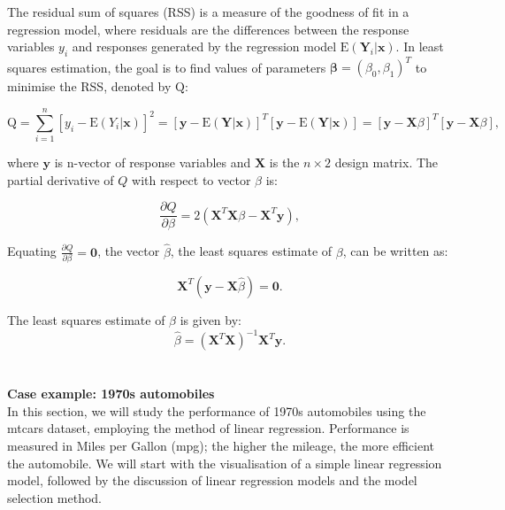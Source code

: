 \documentclass{article}\usepackage[]{graphicx}\usepackage[]{xcolor}
\numberwithin{equation}{section}
\begin{document}
\noindent The residual sum of squares (RSS) is a measure of the goodness of fit in a regression model, where residuals are the differences between the response variables $y_i$ and responses generated by the regression model $\mathrm{E}(\mathbf{Y}_i | \mathbf{x})$. In least squares estimation, the goal is to find values of parameters $\mathbf{\beta} = (\beta_0, \beta_1)^T$ to minimise the RSS, denoted by $\mathrm{Q}$: 

\begin{equation}\label{eq:4-3}
\mathrm{Q} = \sum_{i=1}^{n} [y_i - \mathrm{E} (Y_i | \mathbf{x})]^2 
           = [\mathbf{y}- \mathrm{E} (\mathbf{Y} | \mathbf{x})]^{T} [\mathbf{y}- \mathrm{E} (\mathbf{Y} | \mathbf{x})] 
           = [\mathbf{y}- \mathbf{X} \beta]^{T} [\mathbf{y}- \mathbf{X} \beta],
\end{equation}

\noindent
where $\mathbf{y}$ is n-vector of response variables and $\mathbf{X}$ is the $n \times 2$ design matrix. The partial derivative of $Q$ with respect to vector $\beta$ is:

\begin{equation}\label{eq:4-4}
\frac{\partial Q}{\partial \beta} = 2(\mathbf{X}^T\mathbf{X}\beta - \mathbf{X}^T\mathbf{y}),
\end{equation}

\noindent
Equating $\frac{\partial Q}{\partial \beta} = \mathbf{0}$, the vector $\hat{\beta}$, the least squares estimate of $\beta$, can be written as:

\begin{equation}\label{eq:4-5}
\mathbf{X}^T(\mathbf{y}-\mathbf{X}\hat{\beta})=\mathbf{0}.
\end{equation}

\noindent 
The least squares estimate of $\beta$ is given by:
\begin{equation}\label{eq:4-6}
\hat{\beta} = (\mathbf{X}^T\mathbf{X})^{-1}\mathbf{X}^T\mathbf{y}.
\end{equation}
\\ 
\noident 
\\\textbf{Case example: 1970s automobiles}\\
\noindent In this section, we will study the performance of 1970s automobiles using the mtcars dataset, employing the method of linear regression. Performance is measured in Miles per Gallon (mpg); the higher the mileage, the more efficient the automobile. We will start with the visualisation of a simple linear regression model, followed by the discussion of linear regression models and the model selection method.
\end{document}
